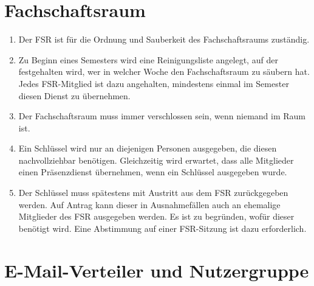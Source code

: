 \documentclass[
	a4paper,
	12pt,
	oneside,
	parskip=half-,
	pagesize,
	headsepline,
	german,
	ngerman
]{scrartcl}
\begin{document}
\section{Fachschaftsraum}

\begin{enumerate}
\item Der FSR ist für die Ordnung und Sauberkeit des Fachschaftsraums zuständig.
\item Zu Beginn eines Semesters wird eine Reinigungsliste angelegt, auf der festgehalten wird, wer in welcher Woche den Fachschaftsraum zu säubern hat. Jedes FSR-Mitglied ist dazu angehalten, mindestens einmal im Semester diesen Dienst zu übernehmen.
\item Der Fachschaftsraum muss immer verschlossen sein, wenn niemand im Raum ist.
\item Ein Schlüssel wird nur an diejenigen Personen ausgegeben, die diesen nachvollziehbar benötigen. Gleichzeitig wird erwartet, dass alle Mitglieder einen Präsenzdienst übernehmen, wenn ein Schlüssel ausgegeben wurde.
\item Der Schlüssel muss spätestens mit Austritt aus dem FSR zurückgegeben werden. Auf Antrag kann dieser in Ausnahmefällen auch an ehemalige Mitglieder des FSR ausgegeben werden. Es ist zu begründen, wofür dieser benötigt wird. Eine Abstimmung auf einer FSR-Sitzung ist dazu erforderlich.

\end{enumerate}

\section{E-Mail-Verteiler und Nutzergruppe}
\end{document}
